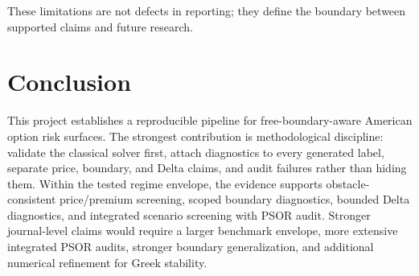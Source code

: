 \documentclass[11pt]{article}
\begin{document}
These limitations are not defects in reporting; they define the boundary between supported claims and future research.

\section{Conclusion}
This project establishes a reproducible pipeline for free-boundary-aware American option risk surfaces. The strongest contribution is methodological discipline: validate the classical solver first, attach diagnostics to every generated label, separate price, boundary, and Delta claims, and audit failures rather than hiding them. Within the tested regime envelope, the evidence supports obstacle-consistent price/premium screening, scoped boundary diagnostics, bounded Delta diagnostics, and integrated scenario screening with PSOR audit. Stronger journal-level claims would require a larger benchmark envelope, more extensive integrated PSOR audits, stronger boundary generalization, and additional numerical refinement for Greek stability.



\end{document}
